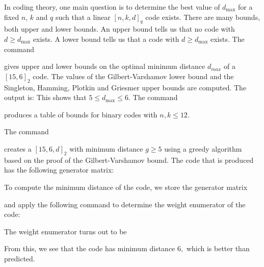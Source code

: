 In coding theory, one main question is 
to determine the best value of $d_{\max}$ for a fixed $n$, $k$ and $q$ such that 
a linear $[n,k,d]_q$ code exists.
There are many bounds, both upper and lower bounds. 
An upper bound tells us that no code with $d \ge d_{\max}$ exists.
A lower bound tells us that a code with $d \ge d_{\max}$ exists. 
The command  



gives upper and lower bounds on the optimal minimum distance $d_{max}$ of a $[15,6]_2$ code.
The values of the Gilbert-Varshamov lower bound 
and the Singleton, Hamming, Plotkin and Griesmer upper bounds are computed. 
The output is:
This shows that $5 \le d_{\max} \le 6.$
The command 


produces a table of bounds for binary codes with $n,k \le 12.$

The command 


creates a $[15,6,d]_2$ with minimum distance $g \ge 5$ 
using a greedy algorithm based on the proof of the Gilbert-Varshamov bound.
The code that is produced has the following generator matrix:


To compute the minimum distance of the code, we store the generator  matrix



and apply the following command to determine the weight enumerator of the code:



The weight enumerator turns out to be


From this, we see that the code has minimum distance $6,$ 
which is better than predicted.

\bigskip
